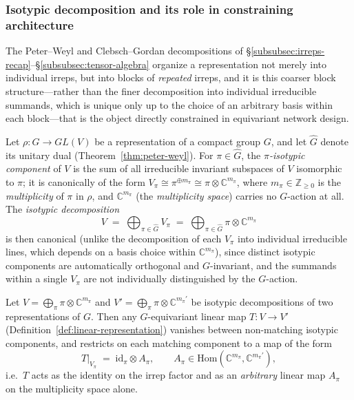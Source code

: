 \documentclass[mathematics,review,submit,moreauthors]{Definitions/mdpi}
\begin{document}

\subsubsection{Isotypic decomposition and its role in constraining architecture}\label{sec:isotypic-decomposition}

The Peter--Weyl and Clebsch--Gordan decompositions of
\S\ref{subsubsec:irreps-recap}--\S\ref{subsubsec:tensor-algebra} organize a
representation not merely into individual irreps, but into blocks of
\emph{repeated} irreps, and it is this coarser block structure---rather than
the finer decomposition into individual irreducible summands, which is
unique only up to the choice of an arbitrary basis within each block---that
is the object directly constrained in equivariant network design.

\begin{Definition}
\label{def:isotypic-decomposition}
Let $\rho : G \to GL(V)$ be a representation of a compact group $G$, and let
$\widehat{G}$ denote its unitary dual (Theorem~\ref{thm:peter-weyl}). For
$\pi \in \widehat{G}$, the \emph{$\pi$-isotypic component} of $V$ is the sum
of all irreducible invariant subspaces of $V$ isomorphic to $\pi$; it is
canonically of the form $V_\pi \cong \pi^{\oplus m_\pi} \cong \pi \otimes
\mathbb{C}^{m_\pi}$, where $m_\pi \in \mathbb{Z}_{\geq 0}$ is the
\emph{multiplicity} of $\pi$ in $\rho$, and $\mathbb{C}^{m_\pi}$ (the
\emph{multiplicity space}) carries no $G$-action at all. The
\emph{isotypic decomposition}
\[
    V \;=\; \bigoplus_{\pi \in \widehat{G}} V_\pi \;=\; \bigoplus_{\pi \in \widehat{G}} \pi \otimes \mathbb{C}^{m_\pi}
\]
is then canonical (unlike the decomposition of each $V_\pi$ into individual
irreducible lines, which depends on a basis choice within
$\mathbb{C}^{m_\pi}$), since distinct isotypic components are automatically
orthogonal and $G$-invariant, and the summands within a single $V_\pi$ are
not individually distinguished by the $G$-action.
\end{Definition}

\begin{Proposition}
\label{prop:schur-blocks}
Let $V = \bigoplus_\pi \pi \otimes \mathbb{C}^{m_\pi}$ and
$V' = \bigoplus_\pi \pi \otimes \mathbb{C}^{m_\pi'}$ be isotypic
decompositions of two representations of $G$. Then any $G$-equivariant
linear map $T : V \to V'$ (Definition~\ref{def:linear-representation})
vanishes between non-matching isotypic components, and restricts on each
matching component to a map of the form
\[
    T\big|_{V_\pi} \;=\; \mathrm{id}_\pi \otimes A_\pi, \qquad A_\pi \in \mathrm{Hom}(\mathbb{C}^{m_\pi}, \mathbb{C}^{m_\pi'}),
\]
i.e.\ $T$ acts as the identity on the irrep factor and as an
\emph{arbitrary} linear map $A_\pi$ on the multiplicity space alone.
\end{Proposition}
\end{document}
